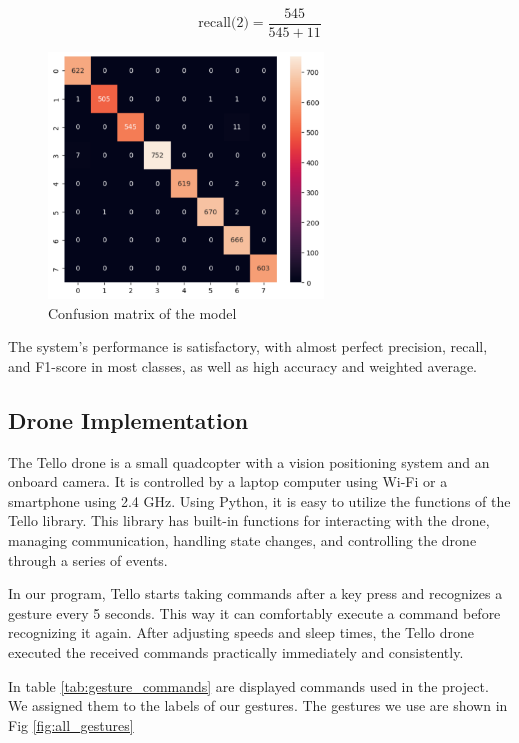 \begin{equation}
	\text{recall(2)} = \frac{545}{545 + 11}
  \label{eq:recall2}
\end{equation}



\begin{figure}
	\centering
	\includegraphics[width = 0.65\textwidth]{images/confusion_matrix.pdf}
	\caption{Confusion matrix of the model}
	\label{fig:confusion_matrix}
\end{figure}

The system's performance is satisfactory, with almost perfect precision, recall, and F1-score in most classes, as well as high accuracy and weighted average.

\subsection{Drone Implementation}

The Tello drone is a small quadcopter with a vision positioning system and an onboard camera. It is controlled by a laptop computer using Wi-Fi or a smartphone using 2.4 GHz. Using Python, it is easy to utilize the functions of the Tello library. This library has built-in functions for interacting with the drone, managing communication, handling state changes, and controlling the drone through a series of events.

In our program, Tello starts taking commands after a key press and recognizes a gesture every 5 seconds. This way it can comfortably execute a command before recognizing it again. After adjusting speeds and sleep times, the Tello drone executed the received commands practically immediately and consistently.

In table \ref{tab:gesture_commands} are displayed commands used in the project. We assigned them to the labels of our gestures. The gestures we use are shown in Fig \ref{fig:all_gestures} 


